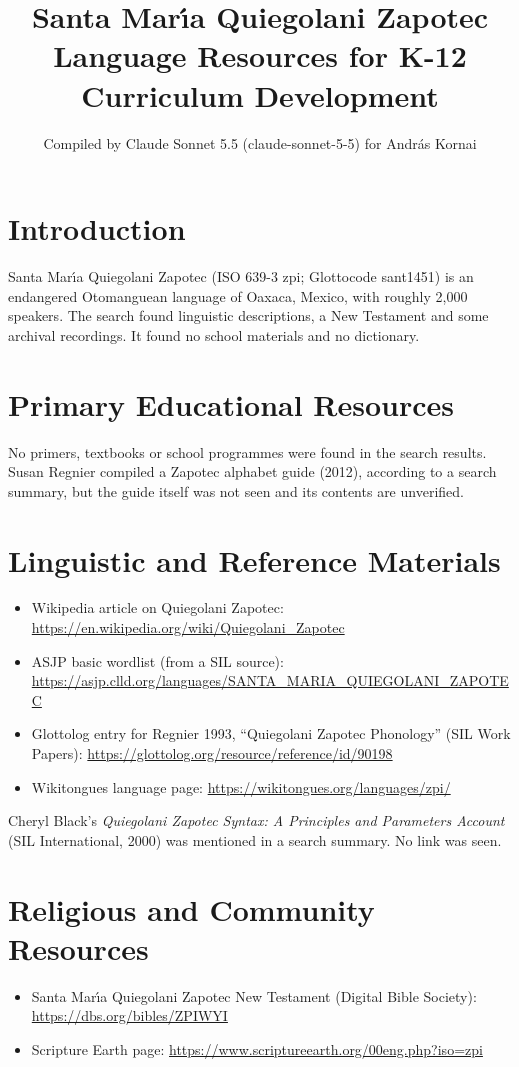 \documentclass[12pt]{article}
\title{Santa Mar\'{\i}a Quiegolani Zapotec Language Resources for K-12 Curriculum Development}
\author{Compiled by Claude Sonnet 5.5 (claude-sonnet-5-5) for Andr\'as Kornai}
\date{}
\begin{document}
\maketitle

\section{Introduction}
Santa Mar\'{\i}a Quiegolani Zapotec (ISO 639-3 zpi; Glottocode sant1451) is an endangered Otomanguean language of Oaxaca, Mexico, with roughly 2,000 speakers. The search found linguistic descriptions, a New Testament and some archival recordings. It found no school materials and no dictionary.

\section{Primary Educational Resources}
No primers, textbooks or school programmes were found in the search results. Susan Regnier compiled a Zapotec alphabet guide (2012), according to a search summary, but the guide itself was not seen and its contents are unverified.

\section{Linguistic and Reference Materials}
\begin{itemize}
\item Wikipedia article on Quiegolani Zapotec: \url{https://en.wikipedia.org/wiki/Quiegolani_Zapotec}
\item ASJP basic wordlist (from a SIL source): \url{https://asjp.clld.org/languages/SANTA_MARIA_QUIEGOLANI_ZAPOTEC}
\item Glottolog entry for Regnier 1993, ``Quiegolani Zapotec Phonology'' (SIL Work Papers): \url{https://glottolog.org/resource/reference/id/90198}
\item Wikitongues language page: \url{https://wikitongues.org/languages/zpi/}
\end{itemize}
Cheryl Black's \emph{Quiegolani Zapotec Syntax: A Principles and Parameters Account} (SIL International, 2000) was mentioned in a search summary. No link was seen.

\section{Religious and Community Resources}
\begin{itemize}
\item Santa Mar\'{\i}a Quiegolani Zapotec New Testament (Digital Bible Society): \url{https://dbs.org/bibles/ZPIWYI}
\item Scripture Earth page: \url{https://www.scriptureearth.org/00eng.php?iso=zpi}
\end{itemize}
\end{document}
